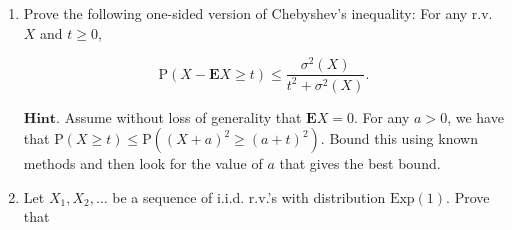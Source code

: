 \documentclass[11pt]{report}
\theoremstyle{plain}
\theoremstyle{definition}
\begin{document}
\begin{enumerate}[label=\arabic*.]
\[
\{0,1\}^n = A_n \cup B_n,
\]

\noindent such that the following statements hold:

\begin{enumerate}[label=\arabic*.]
\item $\mathrm{P}(\mathbf{T}_n \in B_n) < \epsilon$

\item $2^{n(H(p)-\epsilon)} \le |A_n| \le
2^{n(H(p)+\epsilon)}$.
\end{enumerate}

\noindent $\textbf{Notes:}$ The texts in $B_n$ can be thought
of as the ``exceptional sequences'' -- they are the
Martian texts of length $n$ that are rarely observed.
The texts in $A_n$ are called ``typical sequences''.
Because of the two-sided bounds the theorem gives on
the number of typical sequences, it follows that we
can encode them in a computer file of size
approximately $n H(p)$ bits, provided we prepare in
advance a ``code'' that translates the typical
sequences to computer files of the appropriate size
(this can be done algorithmically, for example by
making a list of all the typical sequences sorted in
lexicographic order, and matching them to successive
binary strings of length $(H(p)+\epsilon)n$).

$\textbf{Hint.}$ To prove the theorem, let $P_n$ be
the random variable given by

\[
P_n = \prod_{k=1}^n \left( p^{X_k} (1-p)^{1-X_k} \right).
\]

\noindent Note that $P_n$ measures the probability of the
sequence that was observed up to time $n$. (Somewhat
unusually, in this problem the probability itself is
thought of as a random variable). Try to represent
$P_n$ in terms of cumulative sums of a sequence of
i.i.d. random variables. Apply the Weak Law of Large
Numbers to that sequence, and see where that gets you.

\item Prove the following one-sided version of Chebyshev's
inequality: For any r.v. $X$ and $t\ge0$,

\[
\mathrm{P}(X - \mathbf{E} X \ge t) \le \frac{\sigma^2(X)}{t^2 + \sigma^2(X)}.
\]

\noindent $\textbf{Hint.}$ Assume without loss of generality
that $\mathbf{E} X=0$. For any $a>0$, we have that
$\mathrm{P}(X\ge t) \le \mathrm{P}((X+a)^2\ge
(a+t)^2)$.
Bound this using known methods and then look for the
value of $a$ that gives the best bound.

\item Let $X_1,X_2,\ldots$ be a sequence of i.i.d. r.v.'s
with distribution $\textrm{Exp}(1)$. Prove that


\end{enumerate}
\end{document}

